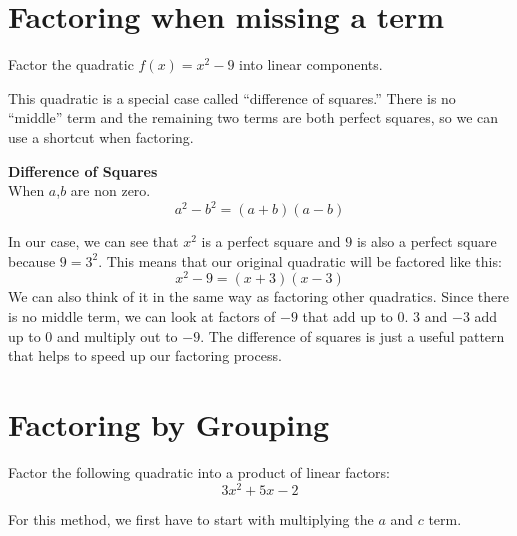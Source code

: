 \documentclass{ximera}
\begin{document}
\section{Factoring when missing a term}
\begin{example}
Factor the quadratic $f(x)=x^2-9$ into linear components.
\begin{explanation}
This quadratic is a special case called ``difference of squares.'' There is no ``middle'' term and the remaining two terms are both perfect squares, so we can use a shortcut when factoring.
\begin{callout}
\textbf{Difference of Squares}\\
When $a$,$b$ are non zero.
\[
a^2-b^2=(a+b)(a-b)
\]
\end{callout}
In our case, we can see that $x^2$ is a perfect square and $9$ is also a perfect square because $9=3^2$. This means that our original quadratic will be factored like this:
\[
x^2-9=(x+3)(x-3)
\]
We can also think of it in the same way as factoring other quadratics. Since there is no middle term, we can look at factors of $-9$ that add up to $0$. $3$ and $-3$ add up to $0$ and multiply out to $-9$. The difference of squares is just a useful pattern that helps to speed up our factoring process.
\end{explanation}
\end{example}
\section{Factoring by Grouping}
\begin{example}
Factor the following quadratic into a product of linear factors:
\[
3x^2+5x-2
\]
\begin{explanation}
For this method, we first have to start with multiplying the $a$ and $c$ term.
\end{explanation}
\end{example}

 
\end{document}
